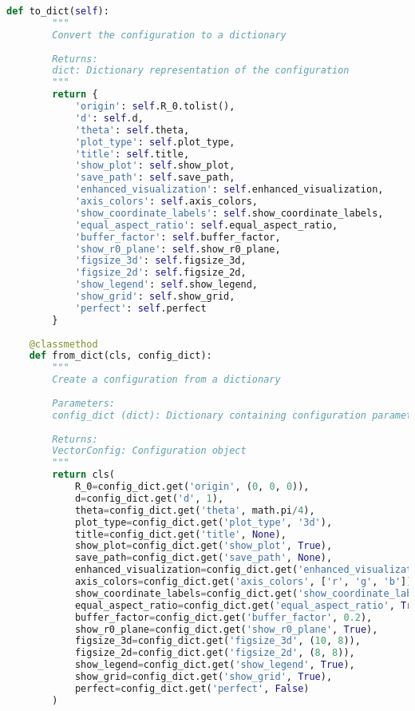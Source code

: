 \begin{lstlisting}[language=Python]
    def to_dict(self):
        """
        Convert the configuration to a dictionary
        
        Returns:
        dict: Dictionary representation of the configuration
        """
        return {
            'origin': self.R_0.tolist(),
            'd': self.d,
            'theta': self.theta,
            'plot_type': self.plot_type,
            'title': self.title,
            'show_plot': self.show_plot,
            'save_path': self.save_path,
            'enhanced_visualization': self.enhanced_visualization,
            'axis_colors': self.axis_colors,
            'show_coordinate_labels': self.show_coordinate_labels,
            'equal_aspect_ratio': self.equal_aspect_ratio,
            'buffer_factor': self.buffer_factor,
            'show_r0_plane': self.show_r0_plane,
            'figsize_3d': self.figsize_3d,
            'figsize_2d': self.figsize_2d,
            'show_legend': self.show_legend,
            'show_grid': self.show_grid,
            'perfect': self.perfect
        }
    
    @classmethod
    def from_dict(cls, config_dict):
        """
        Create a configuration from a dictionary
        
        Parameters:
        config_dict (dict): Dictionary containing configuration parameters
        
        Returns:
        VectorConfig: Configuration object
        """
        return cls(
            R_0=config_dict.get('origin', (0, 0, 0)),
            d=config_dict.get('d', 1),
            theta=config_dict.get('theta', math.pi/4),
            plot_type=config_dict.get('plot_type', '3d'),
            title=config_dict.get('title', None),
            show_plot=config_dict.get('show_plot', True),
            save_path=config_dict.get('save_path', None),
            enhanced_visualization=config_dict.get('enhanced_visualization', True),
            axis_colors=config_dict.get('axis_colors', ['r', 'g', 'b']),
            show_coordinate_labels=config_dict.get('show_coordinate_labels', True),
            equal_aspect_ratio=config_dict.get('equal_aspect_ratio', True),
            buffer_factor=config_dict.get('buffer_factor', 0.2),
            show_r0_plane=config_dict.get('show_r0_plane', True),
            figsize_3d=config_dict.get('figsize_3d', (10, 8)),
            figsize_2d=config_dict.get('figsize_2d', (8, 8)),
            show_legend=config_dict.get('show_legend', True),
            show_grid=config_dict.get('show_grid', True),
            perfect=config_dict.get('perfect', False)
        )
    

\end{lstlisting}
